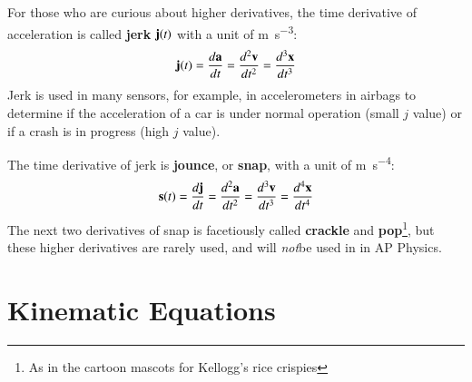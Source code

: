 \documentclass[11pt]{article}
\newcommand{\mb}[1]{\ensuremath\mathbf{#1}}
\begin{document}
For those who are curious about higher derivatives, the time derivative of
acceleration is called \textbf{jerk} $\mb{j}(t)$ with a unit of
\si{\metre\per\second^3}:
\begin{equation*}
  \mb{j}(t)=\frac{d\mb{a}}{dt}=\frac{d^2\mb{v}}{dt^2}=\frac{d^3\mb{x}}{dt^3}
\end{equation*}
 Jerk is used in many sensors, for example, in
accelerometers in airbags to determine if the acceleration of a car is under
normal operation (small $j$ value) or if a crash is in progress (high $j$
value).

The time derivative of jerk is \textbf{jounce}, or \textbf{snap}, with a
unit of \si{\metre\per\second^4}:
\begin{equation*}
  \mb{s}(t)=\frac{d\mb{j}}{dt}=\frac{d^2\mb{a}}{dt^2}=\frac{d^3\mb{v}}{dt^3}
  =\frac{d^4\mb{x}}{dt^4}
\end{equation*}
The next two derivatives of snap is facetiously called \textbf{crackle} and
\textbf{pop}\footnote{As in the cartoon mascots for Kellogg's rice crispies},
but these higher derivatives are rarely used, and will \emph{not}be used in
in AP Physics.



\section{Kinematic Equations}
\end{document}
